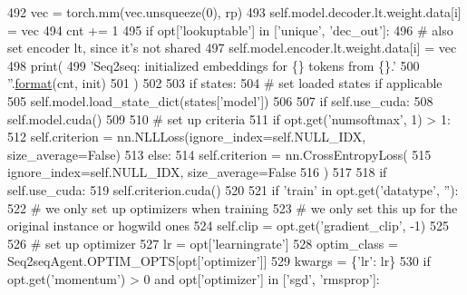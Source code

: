 \begin{DoxyCode}
492                             vec = torch.mm(vec.unsqueeze(0), rp)
493                         self.model.decoder.lt.weight.data[i] = vec
494                         cnt += 1
495                         \textcolor{keywordflow}{if} opt[\textcolor{stringliteral}{'lookuptable'}] \textcolor{keywordflow}{in} [\textcolor{stringliteral}{'unique'}, \textcolor{stringliteral}{'dec\_out'}]:
496                             \textcolor{comment}{# also set encoder lt, since it's not shared}
497                             self.model.encoder.lt.weight.data[i] = vec
498                 print(
499                     \textcolor{stringliteral}{'Seq2seq: initialized embeddings for \{\} tokens from \{\}.'}
500                     \textcolor{stringliteral}{''}.\hyperlink{namespaceparlai_1_1chat__service_1_1services_1_1messenger_1_1shared__utils_a32e2e2022b824fbaf80c747160b52a76}{format}(cnt, init)
501                 )
502 
503             \textcolor{keywordflow}{if} states:
504                 \textcolor{comment}{# set loaded states if applicable}
505                 self.model.load\_state\_dict(states[\textcolor{stringliteral}{'model'}])
506 
507             \textcolor{keywordflow}{if} self.use\_cuda:
508                 self.model.cuda()
509 
510         \textcolor{comment}{# set up criteria}
511         \textcolor{keywordflow}{if} opt.get(\textcolor{stringliteral}{'numsoftmax'}, 1) > 1:
512             self.criterion = nn.NLLLoss(ignore\_index=self.NULL\_IDX, size\_average=\textcolor{keyword}{False})
513         \textcolor{keywordflow}{else}:
514             self.criterion = nn.CrossEntropyLoss(
515                 ignore\_index=self.NULL\_IDX, size\_average=\textcolor{keyword}{False}
516             )
517 
518         \textcolor{keywordflow}{if} self.use\_cuda:
519             self.criterion.cuda()
520 
521         \textcolor{keywordflow}{if} \textcolor{stringliteral}{'train'} \textcolor{keywordflow}{in} opt.get(\textcolor{stringliteral}{'datatype'}, \textcolor{stringliteral}{''}):
522             \textcolor{comment}{# we only set up optimizers when training}
523             \textcolor{comment}{# we only set this up for the original instance or hogwild ones}
524             self.clip = opt.get(\textcolor{stringliteral}{'gradient\_clip'}, -1)
525 
526             \textcolor{comment}{# set up optimizer}
527             lr = opt[\textcolor{stringliteral}{'learningrate'}]
528             optim\_class = Seq2seqAgent.OPTIM\_OPTS[opt[\textcolor{stringliteral}{'optimizer'}]]
529             kwargs = \{\textcolor{stringliteral}{'lr'}: lr\}
530             \textcolor{keywordflow}{if} opt.get(\textcolor{stringliteral}{'momentum'}) > 0 \textcolor{keywordflow}{and} opt[\textcolor{stringliteral}{'optimizer'}] \textcolor{keywordflow}{in} [\textcolor{stringliteral}{'sgd'}, \textcolor{stringliteral}{'rmsprop'}]:

\end{DoxyCode}
